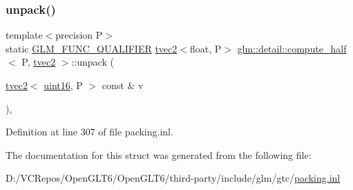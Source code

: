\subsubsection{\texorpdfstring{unpack()}{unpack()}}
{\footnotesize\ttfamily template$<$precision P$>$ \\
static \mbox{\hyperlink{setup_8hpp_a33fdea6f91c5f834105f7415e2a64407}{G\+L\+M\+\_\+\+F\+U\+N\+C\+\_\+\+Q\+U\+A\+L\+I\+F\+I\+ER}} \mbox{\hyperlink{structglm_1_1tvec2}{tvec2}}$<$float, P$>$ \mbox{\hyperlink{structglm_1_1detail_1_1compute__half}{glm\+::detail\+::compute\+\_\+half}}$<$ P, \mbox{\hyperlink{structglm_1_1tvec2}{tvec2}} $>$\+::unpack (\begin{DoxyParamCaption}\item[{\mbox{\hyperlink{structglm_1_1tvec2}{tvec2}}$<$ \mbox{\hyperlink{namespaceglm_1_1detail_a47b2a7d006d187338e8031a352d1ce56}{uint16}}, P $>$ const \&}]{v }\end{DoxyParamCaption})\hspace{0.3cm}{\ttfamily [inline]}, {\ttfamily [static]}}



Definition at line 307 of file packing.\+inl.



The documentation for this struct was generated from the following file\+:\begin{DoxyCompactItemize}
\item 
D\+:/\+V\+C\+Repos/\+Open\+G\+L\+T6/\+Open\+G\+L\+T6/third-\/party/include/glm/gtc/\mbox{\hyperlink{packing_8inl}{packing.\+inl}}\end{DoxyCompactItemize}
